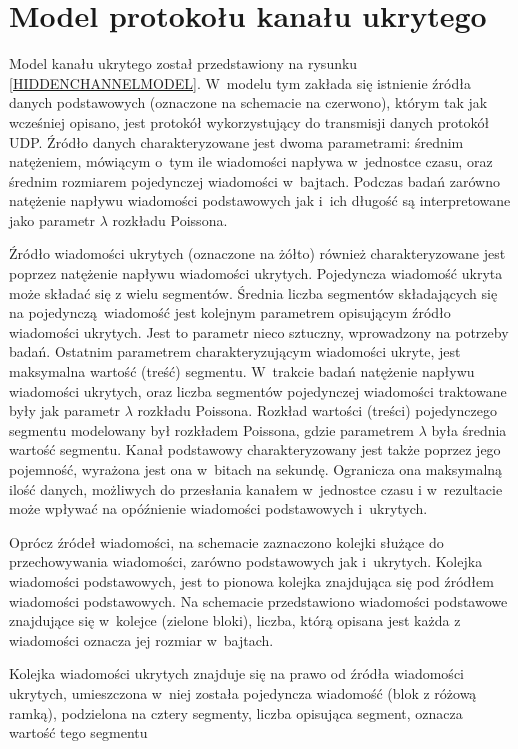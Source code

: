 \documentclass[a4paper, twoside, 12pt]{report}
\begin{document}
    \section{Model protokołu kanału ukrytego}

    Model kanału ukrytego został przedstawiony na rysunku \ref{HIDDENCHANNELMODEL}. W~modelu tym zakłada się
    istnienie źródła danych podstawowych (oznaczone na schemacie na czerwono),
    którym tak jak wcześniej opisano, jest
    protokół wykorzystujący do transmisji danych protokół UDP. Źródło danych
    charakteryzowane jest dwoma parametrami: średnim natężeniem, mówiącym
    o~tym ile wiadomości napływa w~jednostce czasu, oraz średnim rozmiarem
    pojedynczej wiadomości w~bajtach. Podczas badań zarówno natężenie napływu wiadomości
    podstawowych jak i~ich długość są interpretowane jako parametr \(\lambda \) rozkładu
    Poissona.

    Źródło wiadomości ukrytych (oznaczone na żółto) również charakteryzowane jest poprzez natężenie
    napływu wiadomości ukrytych. Pojedyncza wiadomość ukryta może składać się z wielu
    segmentów. Średnia liczba segmentów składających się na pojedynczą wiadomość
    jest kolejnym parametrem opisującym źródło wiadomości ukrytych. Jest to parametr
    nieco sztuczny, wprowadzony na potrzeby badań. Ostatnim parametrem charakteryzującym
    wiadomości ukryte, jest maksymalna wartość (treść) segmentu. W~trakcie badań
    natężenie napływu wiadomości ukrytych, oraz liczba segmentów pojedynczej wiadomości
    traktowane były jak parametr \(\lambda \) rozkładu Poissona. Rozkład wartości (treści)
    pojedynczego segmentu modelowany był rozkładem Poissona, gdzie parametrem \(\lambda\) była
    średnia wartość segmentu. Kanał podstawowy charakteryzowany jest także
    poprzez jego pojemność, wyrażona jest ona w~bitach na sekundę. Ogranicza ona
    maksymalną ilość danych, możliwych do przesłania kanałem w~jednostce czasu i
    w~rezultacie może wpływać na opóźnienie wiadomości podstawowych i~ukrytych.

    Oprócz źródeł wiadomości, na schemacie zaznaczono kolejki służące do przechowywania
    wiadomości, zarówno podstawowych jak i~ukrytych. Kolejka wiadomości podstawowych,
    jest to pionowa kolejka znajdująca się pod źródłem wiadomości podstawowych.
    Na schemacie przedstawiono wiadomości podstawowe znajdujące się w~kolejce (zielone bloki),
    liczba, którą opisana jest każda z wiadomości oznacza jej rozmiar w~bajtach.

    Kolejka wiadomości ukrytych znajduje się na prawo od źródła wiadomości ukrytych,
    umieszczona w~niej została pojedyncza wiadomość (blok z różową ramką), podzielona
    na cztery segmenty, liczba opisująca segment, oznacza wartość tego segmentu
\end{document}
